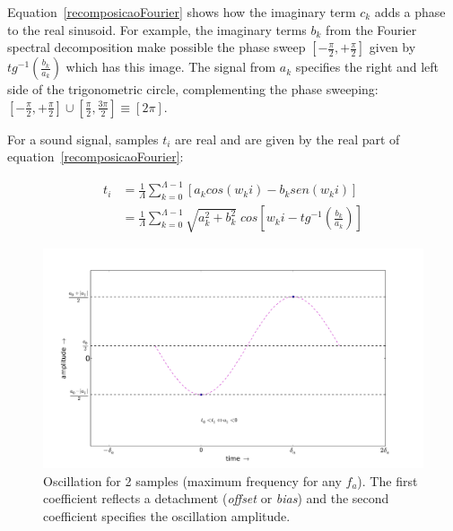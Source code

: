 \documentclass[
 aip,
 jmp,
 amsmath,amssymb,
 reprint,
]{revtex4-1}
\begin{document}
Equation~\ref{recomposicaoFourier} shows how the imaginary term $c_k$ adds a phase to the real sinusoid. For example, the imaginary terms $b_k$ from the Fourier spectral decomposition make possible the phase sweep $\left[-\frac{\pi}{2},+\frac{\pi}{2}\right]$ given by $tg^{-1}\left(\frac{b_k}{a_k}\right)$ which has this image. The signal from $a_k$ specifies the right and left side of the trigonometric circle, complementing the phase sweeping: $\left[-\frac{\pi}{2},+\frac{\pi}{2}\right] \cup \left[\frac{\pi}{2},\frac{3\pi}{2}\right]\equiv [2\pi]$.

For a sound signal, samples $t_i$ are real and are given by the real part of equation~\ref{recomposicaoFourier}:

\begin{equation}\label{moduloEfase}
\begin{split}
t_i& = \frac{1}{\Lambda}\sum_{k=0}^{\Lambda-1}\left[a_k cos(w_k i) -b_k sen(w_k i)\right] \\
   & = \frac{1}{\Lambda}\sum_{k=0}^{\Lambda-1}\sqrt{a_k^2 + b_k^2} \; cos\left[w_k i - tg^{-1}\left(\frac{b_k}{a_k}\right)\right]
\end{split}
\end{equation}

 \begin{figure}[h!]
     \centering
         \includegraphics[width=\columnwidth]{figures/amostras2c__}
     \caption{Oscillation for 2 samples (maximum frequency for any $f_a$). The first coefficient reflects a detachment (\emph{offset} or \emph{bias}) and the second coefficient specifies the oscillation amplitude.}
         \label{fig:amostras2}
 \end{figure}
\end{document}
